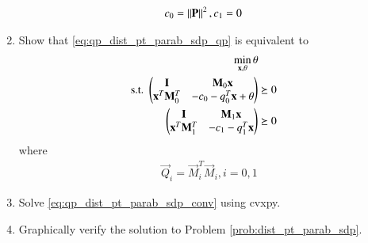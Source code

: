 \begin{enumerate}[label=\arabic*.,ref=\thesection.\theenumi]
\begin{align}
c_0 &= \left\lVert\mathbf{P}\right\rVert^2, c_1 = 0
\end{align}
%
\item Show that \eqref{eq:qp_dist_pt_parab_sdp_qp} is equivalent to
\begin{align}
\label{eq:qp_dist_pt_parab_sdp_conv}
\begin{split}
\min_{\mathbf{x},\theta}\theta
\\
\text{s.t. } \begin{pmatrix}\mathbf{I} & \mathbf{M}_0\mathbf{x} \\ \mathbf{x}^T\mathbf{M}_0^T & -c_0-q_0^T\mathbf{x}+\theta\end{pmatrix} &\succeq 0
\\
\begin{pmatrix}\mathbf{I} & \mathbf{M}_1\mathbf{x} \\ \mathbf{x}^T\mathbf{M}_1^T & -c_1-q_1^T\mathbf{x}\end{pmatrix} &\succeq 0
\end{split}
\end{align}
%
%
where
\begin{align}
\vec{Q}_i = \vec{M}_i^T\vec{M}_i, i = 0, 1
\end{align}
%
\item Solve \eqref{eq:qp_dist_pt_parab_sdp_conv} using cvxpy.
\item Graphically verify the solution to Problem \ref{prob:dist_pt_parab_sdp}. 
%


\end{enumerate}
